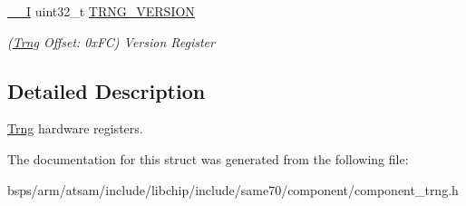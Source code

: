 \begin{DoxyCompactItemize}
\item 
\mbox{\label{structTrng_ae3ce51213047ad66faa26c53fc60dfc6}} 
\mbox{\hyperlink{core__cm7_8h_af63697ed9952cc71e1225efe205f6cd3}{\+\_\+\+\_\+I}} uint32\+\_\+t \mbox{\hyperlink{structTrng_ae3ce51213047ad66faa26c53fc60dfc6}{T\+R\+N\+G\+\_\+\+V\+E\+R\+S\+I\+ON}}
\begin{DoxyCompactList}\small\item\em (\mbox{\hyperlink{structTrng}{Trng}} Offset\+: 0x\+FC) Version Register \end{DoxyCompactList}\end{DoxyCompactItemize}


\subsection{Detailed Description}
\mbox{\hyperlink{structTrng}{Trng}} hardware registers. 

The documentation for this struct was generated from the following file\+:\begin{DoxyCompactItemize}
\item 
bsps/arm/atsam/include/libchip/include/same70/component/component\+\_\+trng.\+h\end{DoxyCompactItemize}
